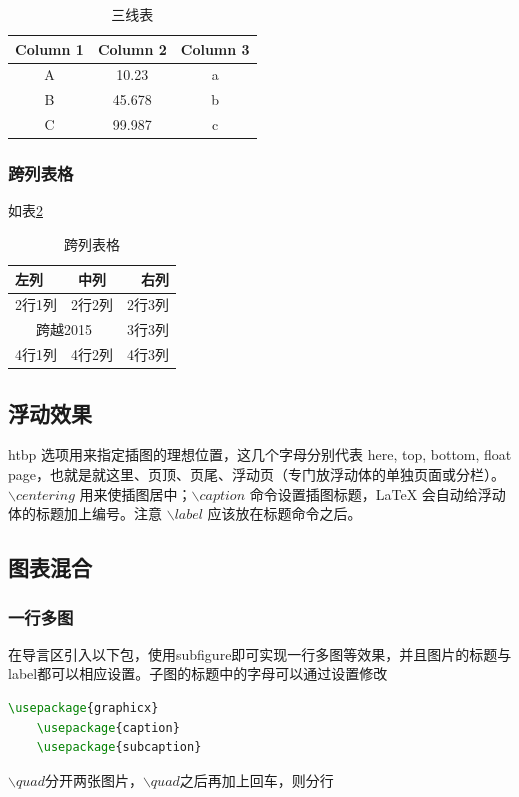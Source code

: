 \begin{table}[h!]
    \centering
      \begin{tabular}{ccc}
        \toprule 
        \textbf{Column 1} & \textbf{Column 2} & \textbf{Column 3}\\
        \midrule
        A & 10.23 & a\\
        B & 45.678 & b\\
        C & 99.987 & c\\
        \bottomrule
      \end{tabular}
    \caption{三线表}
    \label{tab:mytab2_}
\end{table}

\subsubsection{跨列表格}
如表\ref{tab:mytab3}
\begin{table}[htbp]
    \centering
    \begin{tabular}{|l|c|r|}
      \hline
      左列 & 中列 & 右列 \\
      \hline
      2行1列 & 2行2列 & 2行3列 \\
      \hline
      \multicolumn{2}{|c|}{跨越2015} & 3行3列 \\
      \hline
      4行1列 & 4行2列 & 4行3列 \\
      \hline
    \end{tabular}
    \caption{跨列表格}
    \label{tab:mytab3}
\end{table}

\subsection{浮动效果}
 htbp 选项用来指定插图的理想位置，这几个字母分别代表 here, top, bottom, float page，也就是就这里、页顶、页尾、浮动页（专门放浮动体的单独页面或分栏）。$\backslash centering$ 用来使插图居中；$\backslash caption$ 命令设置插图标题，LaTeX 会自动给浮动体的标题加上编号。注意 $\backslash label$ 应该放在标题命令之后。

\subsection{图表混合}
\subsubsection{一行多图}
在导言区引入以下包，使用subfigure即可实现一行多图等效果，并且图片的标题与label都可以相应设置。子图的标题中的字母可以通过设置修改
\begin{lstlisting}[language={TeX}]
    \usepackage{graphicx}
    \usepackage{caption}
    \usepackage{subcaption}
\end{lstlisting}
$\backslash quad$分开两张图片，$\backslash quad$之后再加上回车，则分行

